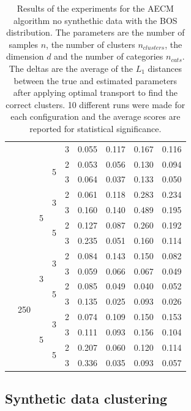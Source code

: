 \begin{table}[H]
\begin{minipage}{.48\columnwidth}
\begin{adjustbox}{width=\columnwidth}
\begin{tabular}{lllllrrrr}
 &  &  &  & 3 & 0.055 & 0.117 & 0.167 & 0.116 \\
\cline{4-9}
 &  &  & \multirow[t]{2}{*}{5} & 2 & 0.053 & 0.056 & 0.130 & 0.094 \\
 &  &  &  & 3 & 0.064 & 0.037 & 0.133 & 0.050 \\
\cline{3-9} \cline{4-9}
 &  & \multirow[t]{4}{*}{5} & \multirow[t]{2}{*}{3} & 2 & 0.061 & 0.118 & 0.283 & 0.234 \\
 &  &  &  & 3 & 0.160 & 0.140 & 0.489 & 0.195 \\
\cline{4-9}
 &  &  & \multirow[t]{2}{*}{5} & 2 & 0.127 & 0.087 & 0.260 & 0.192 \\
 &  &  &  & 3 & 0.235 & 0.051 & 0.160 & 0.114 \\
\cline{2-9} \cline{3-9} \cline{4-9}
 & \multirow[t]{8}{*}{250} & \multirow[t]{4}{*}{3} & \multirow[t]{2}{*}{3} & 2 & 0.084 & 0.143 & 0.150 & 0.082 \\
 &  &  &  & 3 & 0.059 & 0.066 & 0.067 & 0.049 \\
\cline{4-9}
 &  &  & \multirow[t]{2}{*}{5} & 2 & 0.085 & 0.049 & 0.040 & 0.052 \\
 &  &  &  & 3 & 0.135 & 0.025 & 0.093 & 0.026 \\
\cline{3-9} \cline{4-9}
 &  & \multirow[t]{4}{*}{5} & \multirow[t]{2}{*}{3} & 2 & 0.074 & 0.109 & 0.150 & 0.153 \\
 &  &  &  & 3 & 0.111 & 0.093 & 0.156 & 0.104 \\
\cline{4-9}
 &  &  & \multirow[t]{2}{*}{5} & 2 & 0.207 & 0.060 & 0.120 & 0.114 \\
 &  &  &  & 3 & 0.336 & 0.035 & 0.093 & 0.057 \\
\cline{1-9} \cline{2-9} \cline{3-9} \cline{4-9}
\bottomrule
\end{tabular}
\end{adjustbox}
\caption{Results of the experiments for the AECM algorithm no synthethic data with the BOS distribution. The parameters are the number of samples $n$, the number of clusters $n_{clusters}$, the dimension $d$ and the number of categories $n_{cats}$. The deltas are the average of the $L_1$ distances between the true and estimated parameters after applying optimal transport to find the correct clusters. 10 different runs were made for each configuration and the average scores are reported for statistical significance.}
\label{tab:results_bos}
\end{minipage}
\end{table}

\subsection*{Synthetic data clustering}
\label{sec:appendix_synth_clustering}

